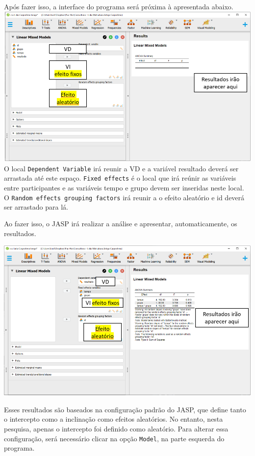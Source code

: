 \documentclass[
]{book}
\begin{document}
Após fazer isso, a interface do programa será próxima à apresentada abaixo.
\includegraphics{./img/cap_lmm_interface2.png}
O local \texttt{Dependent\ Variable} irá reunir a VD e a variável resultado deverá ser arrastada até este espaço. \texttt{Fixed\ effects} é o local que irá reúnir as variáveis entre participantes e as variáveis tempo e grupo devem ser inseridas neste local. O \texttt{Random\ effects\ grouping\ factors} irá reunir a o efeito aleatório e id deverá ser arrastado para lá.

Ao fazer isso, o JASP irá realizar a análise e apresentar, automaticamente, os resultados.

\includegraphics{./img/cap_lmm_interface3.png}

Esses resultados são baseados na configuração padrão do JASP, que define tanto o intercepto como a inclinação como efeitos aleatórios. No entanto, nesta pesquisa, apenas o intercepto foi definido como aleatório. Para alterar essa configuração, será necessário clicar na opção \texttt{Model}, na parte esquerda do programa.
\end{document}
